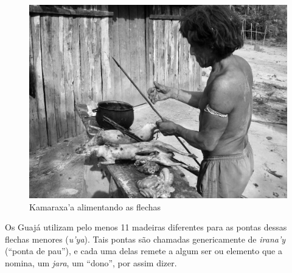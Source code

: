 \begin{figure}[H]
\centering
  \includegraphics[width=\textwidth]{./imgs/100_5107}
\caption{Kamaraxa’a alimentando as flechas}
\end{figure}

Os Guajá utilizam pelo menos 11 madeiras diferentes para as pontas
dessas flechas menores (\emph{u'ya}). Tais pontas são chamadas
genericamente de \emph{irana'y} (``ponta de pau''), e cada uma delas
remete a algum ser ou elemento que a nomina, um \emph{jara}, um
``dono'', por assim dizer.

